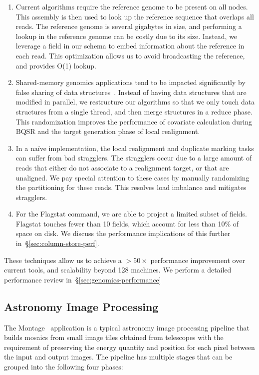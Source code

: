 \documentclass{acm_proc_article-sp}
\begin{document}
\begin{enumerate}
\item Current algorithms require the reference genome to be present on all nodes. This assembly is then used to
look up the reference sequence that overlaps all reads. The reference genome is several gigabytes in
size, and performing a lookup in the reference genome can be costly due to its size. Instead, we leverage
a field in our schema to embed information about the reference in each read. This optimization allows us to avoid
broadcasting the reference, and provides O(1) lookup.
\item Shared-memory genomics applications tend to be impacted significantly by false sharing of data
\linebreak structures~\cite{zaharia11}. Instead of having data structures that are modified in parallel, we
restructure our algorithms so that we only touch data structures from a single thread, and then merge
structures in a reduce phase. This randomization improves the performance of covariate calculation during BQSR
and the target generation phase of local realignment.
\item In a na\"{i}ve implementation, the local realignment and duplicate marking tasks can suffer from bad
stragglers. The stragglers occur due to a large amount of reads that either do not associate to a realignment
target, or that are unaligned. We pay special attention to these cases by manually randomizing the
partitioning for these reads. This resolves load imbalance and mitigates stragglers.
\item For the Flagstat command, we are able to project a limited subset of fields. Flagstat touches fewer
than 10 fields, which account for less than 10\% of space on disk. We discuss the performance
implications of this further in~\S\ref{sec:column-store-perf}.
\end{enumerate}

These techniques allow us to achieve a $>50\times$ performance improvement over current tools, and
scalability beyond 128 machines. We perform a detailed performance review
in~\S\ref{sec:genomics-performance}

\subsection{Astronomy Image Processing}
\label{sec:astronomy-image-processing}

The Montage~\cite{montage} application is a typical astronomy image processing pipeline that builds
mosaics from small image tiles obtained from telescopes with the requirement of preserving the energy
quantity and position for each pixel between the input and output images. The pipeline has multiple
stages that can be grouped into the following four phases:
\end{document}
